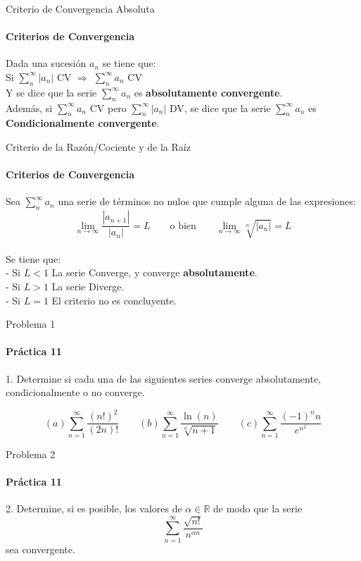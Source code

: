 \documentclass{plantillaPPT}
\begin{document}
\primeraDiapo

\begin{frame}{Criterio de Convergencia Absoluta}
\framesubtitle{Criterios de Convergencia}

Dada una sucesión \(a_n\) se tiene que:\\[2ex]
Si \(\displaystyle\sum_{n}^\infty |a_n|\) CV \(\Rightarrow\) \(\displaystyle\sum_{n}^\infty a_n\) CV\\[2ex]
Y se dice que la serie \(\displaystyle\sum_{n}^\infty a_n\) es \textbf{absolutamente convergente}.\\[4ex]
Además, si \(\displaystyle\sum_{n}^\infty a_n\) CV pero \(\displaystyle\sum_{n}^\infty |a_n|\) DV, se dice que la serie \(\displaystyle\sum_{n}^\infty a_n\) es \textbf{Condicionalmente convergente}.
\end{frame}

\begin{frame}{Criterio de la Razón/Cociente y de la Raíz}
\framesubtitle{Criterios de Convergencia}

Sea \(\displaystyle\sum_{n}^\infty a_n\) una serie de términos no nulos que cumple alguna de las expresiones:\\[2ex]

\[\lim_{n\to\infty}\frac{|a_{n+1}|}{|a_n|} = L \qquad \text{o bien} \qquad \lim_{n\to\infty}\sqrt[n]{|a_n|} = L\]\\[2ex]
Se tiene que:\\[2ex]
- Si \(L<1\) La serie Converge, y converge \textbf{absolutamente}. \\[2ex]
- Si \(L>1\) La serie Diverge.\\[2ex]
- Si \(L=1\) El criterio no es concluyente.
    
\end{frame}

\begin{frame}{Problema 1}
\framesubtitle{Práctica 11}

1. Determine si cada una de las siguientes series converge absolutamente, condicionalmente o no converge.

\begin{equation*}
    (a) \sum_{n=1}^\infty \frac{(n!)^2}{(2n)!} \qquad (b)\sum_{n=1}^\infty \frac{\ln(n)}{\sqrt[n]{n+1}} \qquad (c) \sum_{n=1}^\infty \frac{(-1)^nn}{e^{n^2}}
\end{equation*}

\end{frame}

\begin{frame}{Problema 2}
\framesubtitle{Práctica 11}

2. Determine, si es posible, los valores de $\alpha\in\mathbb{R}$ de modo que la serie
\begin{equation*}
    \sum_{n=1}^\infty \frac{\sqrt{n!}}{n^{\alpha n}}
\end{equation*}
sea convergente.

\end{frame}
\end{document}
